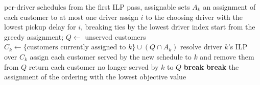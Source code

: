 \begin{breakablealgorithm}
\caption{Conflict resolution between drivers}
\label{alg:conflict}
\begin{algorithmic}[1]
\Require per-driver schedules from the first ILP pass, assignable sets $A_k$
\Ensure an assignment of each customer to at most one driver
 
  \State assign $i$ to the choosing driver with the lowest pickup delay for $i$, breaking ties by the lowest driver index
\EndFor
{}
  \State start from the greedy assignment; $Q \gets$ unserved customers
   
      \State $C_k \gets \{\text{customers currently assigned to } k\} \cup (Q \cap A_k)$
        \State resolve driver $k$'s ILP over $C_k$
        \State assign each customer served by the new schedule to $k$ and remove them from $Q$
        \State return each customer no longer served by $k$ to $Q$
      \EndIf
    \EndFor
      \State \textbf{break}
    \EndIf
      \State \textbf{break}
    \EndIf
  \EndFor
\EndFor
\State \Return the assignment of the ordering with the lowest objective value
\end{algorithmic}
\end{breakablealgorithm}